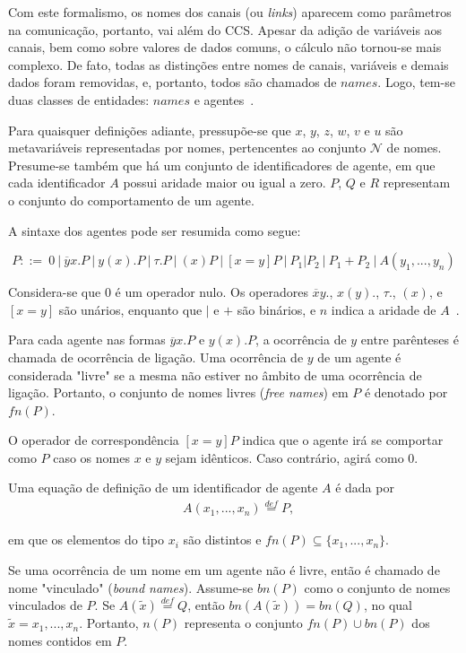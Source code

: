 Com este formalismo, os nomes dos canais (ou \textit{links}) aparecem como parâmetros na comunicação, portanto, vai além do CCS. Apesar da adição de variáveis aos canais, bem como sobre valores de dados comuns, o cálculo não tornou-se mais complexo. De fato, todas as distinções entre nomes de canais, variáveis e demais dados foram removidas, e, portanto, todos são chamados de $names$. Logo, tem-se duas classes de entidades: $names$ e agentes~\cite{milner1992calculus}.

Para quaisquer definições adiante, pressupõe-se que $x$, $y$, $z$, $w$, $v$ e $u$ são metavariáveis representadas por nomes, pertencentes ao conjunto $\mathcal{N}$ de nomes. Presume-se também que há um conjunto de identificadores de agente, em que cada identificador $A$ possui aridade maior ou igual a zero. $P$, $Q$ e $R$ representam o conjunto do comportamento de um agente.

A sintaxe dos agentes pode ser resumida como segue:

\begin{equation}
P ::=~0~
|~\overline{y}x.P~
|~y(x).P~
|~\tau.P~
|~(x)P~
|~[x = y]P~
|~P_{1}|P_{2}~
|~P_{1} + P_{2}~
|~A(y_{1}, ..., y_{n})
\end{equation}

Considera-se que $0$ é um operador nulo. Os operadores $\overline{x}y.$, $x(y).$, $\tau.$, $(x)$, e $[x=y]$ são unários, enquanto que $|$ e $+$ são binários, e $n$ indica a aridade de $A$~\cite{milner1992calculus2}. 

Para cada agente nas formas $\overline{y}x.P$ e $y(x).P$, a ocorrência de $y$ entre parênteses é chamada de ocorrência de ligação. Uma ocorrência de $y$ de um agente é considerada "livre" se a mesma não estiver no âmbito de uma ocorrência de ligação. Portanto, o conjunto de nomes livres (\textit{free names}) em $P$ é denotado por $fn(P)$.

O operador de correspondência $[x = y]P$ indica que o agente irá se comportar como $P$ caso os nomes $x$ e $y$ sejam idênticos. Caso contrário, agirá como $0$.

Uma equação de definição de um identificador de agente $A$ é dada por
\begin{align*}
&A(x_{1}, ..., x_{n})\stackrel{def}{=}P,
\end{align*}  

em que os elementos do tipo $x_{i}$ são distintos e $fn(P)\subseteq \{x_{1}, ..., x_{n}\}$.

Se uma ocorrência de um nome em um agente não é livre, então é chamado de nome "vinculado" (\textit{bound names}). Assume-se $bn(P)$ como o conjunto de nomes vinculados de $P$. Se $A (\tilde{x})\stackrel{def}{=} Q$, então $bn(A (\tilde{x})) = bn(Q)$, no qual $\tilde{x} = x_{1}, ..., x_{n}$. Portanto, $n(P)$ representa o conjunto $fn(P) \cup bn(P)$ dos nomes contidos em $P$.

